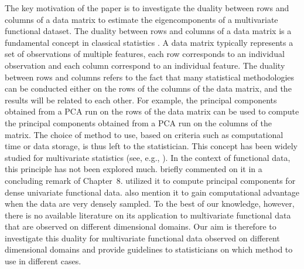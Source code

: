 The key motivation of the paper is to investigate the duality between rows and columns of a data matrix to estimate the eigencomponents of a multivariate functional dataset. The duality between rows and columns of a data matrix is a fundamental concept in classical statistics \citep{escofierTraitementSimultaneVariables1979,saportaSimultaneousAnalysisQualitative1990}. A data matrix typically represents a set of observations of multiple features, each row corresponds to an individual observation and each column correspond to an individual feature. The duality between rows and columns refers to the fact that many statistical methodologies can be conducted either on the rows of the columns of the data matrix, and the results will be related to each other. For example, the principal components obtained from a PCA run on the rows of the data matrix can be used to compute the principal components obtained from a PCA run on the columns of the matrix. The choice of method to use, based on criteria such as computational time or data storage, is thus left to the statistician. This concept has been widely studied for multivariate statistics (see, e.g., \cite{pagesMultipleFactorAnalysis2014,hardleAppliedMultivariateStatistical2019}). In the context of functional data, this principle has not been explored much. \cite{ramsayFunctionalDataAnalysis2005} briefly commented on it in a concluding remark of Chapter~8. \cite{kneipInferenceDensityFamilies2001,benkoCommonFunctionalPrincipal2009} utilized it to compute principal components for dense univariate functional data. \cite{chenQuantifyingInfiniteDimensionalData2017} also mention it to gain computational advantage when the data are very densely sampled. To the best of our knowledge, however, there is no available literature on its application to multivariate functional data that are observed on different dimensional domains. Our aim is therefore to investigate this duality for multivariate functional data observed on different dimensional domains and provide guidelines to statisticians on which method to use in different cases.

